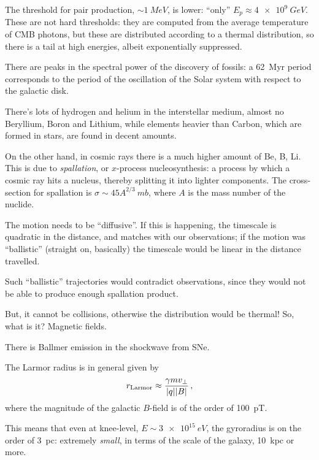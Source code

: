 \documentclass[main.tex]{subfiles}
\begin{document}
The threshold for pair production, \(\sim \SI{1}{MeV}\), is lower: ``only'' \(E_p \approx \SI{4e9}{GeV}\). 
These are not hard thresholds: they are computed from the 
average temperature of CMB photons, but these are distributed according to a thermal distribution, so there is a tail at high energies, albeit exponentially suppressed. 

There are peaks in the spectral power of the discovery of fossils: 
a \SI{62}{Myr} period corresponds to the period of the oscillation of the Solar system 
with respect to the galactic disk. 


There's lots of hydrogen and helium in the interstellar medium, 
almost no Beryllium, Boron and Lithium, 
while elements heavier than Carbon, which are formed in stars, are found in decent amounts.

On the other hand, in cosmic rays there is a much higher amount of Be, B, Li.
This is due to \emph{spallation}, or \(x\)-process nucleosynthesis: a process by which a cosmic ray hits a nucleus, thereby splitting it into lighter components. 
The cross-section for spallation is \(\sigma \sim 45 A^{2/3} \SI{}{mb}\), where \(A\) is the mass number of the nuclide.

The motion needs to be ``diffusive''.
If this is happening, the timescale is quadratic in the distance, and matches with our observations; if the motion
was ``ballistic'' (straight on, basically) the timescale would be linear in the distance travelled. 

Such ``ballistic'' trajectories would contradict observations, since they would not be able to produce enough spallation product. 

But, it cannot be collisions, otherwise the distribution would be thermal! So, what is it?
Magnetic fields. 

There is Ballmer emission in the shockwave from SNe. 

The Larmor radius is in general given by 
%
\begin{align}
r _{\text{Larmor}} \approx \frac{\gamma m v_\perp}{\abs{q} \abs{B}}
\,,
\end{align}
%
where the magnitude of the galactic \(B\)-field is of the order of \SI{100}{pT}.


This means that even at knee-level, \(E \sim \SI{3e15}{eV}\), the gyroradius is on the order of \SI{3}{pc}: extremely \emph{small}, in terms of the scale of the galaxy, \SI{10}{kpc} or more.
\end{document}
